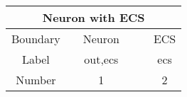 \begin{tabular}{|c|c|c|c|c|c|}
    \multicolumn{6}{c}{Neuron with ECS}                                                                                                                                                                                               \\ \hline
    Boundary                  &                             & Neuron                                        &                                                &                                                & ECS                   \\ \hline
    Label                     &                             & out,ecs                                       &                                                &                                                & ecs                   \\ \hline
    Number                    &                             & 1                                             &                                                &                                                & 2                     \\ \hline
\end{tabular}
